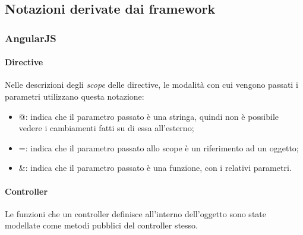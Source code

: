 \subsection{Notazioni derivate dai framework}
	\subsubsection{AngularJS}
		\paragraph{Directive}
		Nelle descrizioni degli \textit{scope} delle directive, le modalità con cui vengono passati i parametri utilizzano questa notazione:
		\begin{itemize}
			\item @: indica che il parametro passato è una stringa, quindi non è possibile vedere i cambiamenti fatti su di essa all'esterno;
			\item =: indica che il parametro passato allo scope è un riferimento ad un oggetto;
			\item \&: indica che il parametro passato è una funzione, con i relativi parametri.
		\end{itemize}
		
		\paragraph{Controller}
		Le funzioni che un controller definisce all'interno dell'oggetto \SCOPE sono state modellate come metodi pubblici del controller stesso.